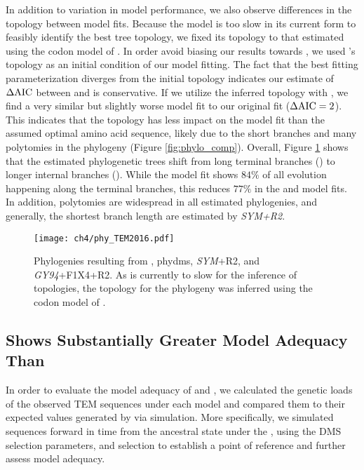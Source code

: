 In addition to variation in model performance, we also observe differences in the topology between model fits.
Because the \selac model is too slow in its current form to feasibly identify the best tree topology, we fixed its topology to that estimated using the codon model of \citet{KosiolEtAl07}.
In order avoid biasing our results towards \selac, we used \selac's topology as an initial condition of our \phydms model fitting.
The fact that the best fitting \phydms parameterization diverges from the initial topology indicates our estimate of $\Delta\text{AIC}$ between \selac and \phydms is conservative.
If we utilize the \phydms inferred topology with \selac, we find a very similar but slightly worse model fit to our original \selac fit ($\Delta\text{AIC} = 2$).
This indicates that the topology has less impact on the model fit than the assumed optimal amino acid sequence, likely due to the short branches and many polytomies in the phylogeny (Figure \ref{fig:phylo_comp}).
Overall, Figure \ref{fig:phylo} shows that the estimated phylogenetic trees shift from long terminal branches (\selac) to longer internal branches (\phydms).
While the \selac model fit shows $84 \%$ of all evolution happening along the terminal branches, this reduces $77 \%$ in the \phydms and \gy model fits.
In addition, polytomies are widespread in all estimated phylogenies, and generally, the shortest branch length are estimated by \emph{SYM+R2}.



\singlespacing
\begin{figure}[H]
     \centering
	\texttt{[image: ch4/phy\_TEM2016.pdf]}
	\caption{Phylogenies resulting from \selac, phydms, \emph{SYM}+R2, and \emph{GY94}+F1X4+R2. As \selac is currently to slow for the inference of topologies, the topology for the \selac phylogeny was inferred using the codon model of \citet{KosiolEtAl07}.}
	\label{fig:phylo}
\end{figure}
\doublespacing

\subsection{\selac Shows Substantially Greater Model Adequacy Than \phydms}

In order to evaluate the model adequacy of \selac and \phydms, we calculated the genetic loads of the observed TEM sequences under each model and compared them to their expected values generated by via simulation.
More specifically, we simulated sequences forward in time from the ancestral state under the \phydms, using the DMS selection parameters, and \selac selection to establish a point of reference and further assess model adequacy.

